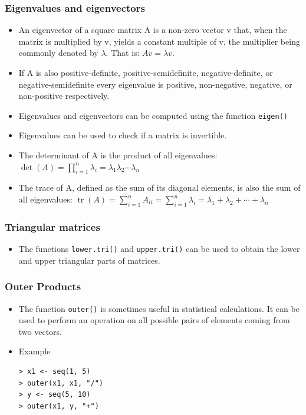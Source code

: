 \documentclass[10pt]{beamer}
\begin{document}
\begin{frame}
  \frametitle{Eigenvalues and eigenvectors}

  \begin{itemize}
  \item An eigenvector of a square matrix A is a non-zero vector v
    that, when the matrix is multiplied by v, yields a constant
    multiple of v, the multiplier being commonly denoted by
    $\lambda$. That is: $A v = \lambda v$.

  \item If A is also positive-definite, positive-semidefinite,
    negative-definite, or negative-semidefinite every eigenvalue is
    positive, non-negative, negative, or non-positive respectively.

  \item Eigenvalues and eigenvectors can be computed using the
    function \texttt{eigen()}

  \item Eigenvalues can be used to check if a matrix is invertible.

  \item The determinant of A is the product of all eigenvalues:
    $\operatorname{det}(A) = \prod_{i=1}^n \lambda_i=\lambda_1\lambda_2\cdots\lambda_n$

  \item
    The trace of A, defined as the sum of its diagonal elements, is also the sum of all eigenvalues:
    $\operatorname{tr}(A) = \sum_{i=1}^n A_{i i} = \sum_{i=1}^n \lambda_i = \lambda_1+ \lambda_2 +\cdots+ \lambda_n$

  \end{itemize}

\end{frame}

\begin{frame}
  \frametitle{Triangular matrices}

  \begin{itemize}
  \item The functions \texttt{lower.tri()} and \texttt{upper.tri()}
    can be used to obtain the lower and upper triangular parts of
    matrices.
  \end{itemize}
\end{frame}

\begin{frame}[fragile]
  \frametitle{Outer Products}

  \begin{itemize}
  \item The function \texttt{outer()} is sometimes useful in
    statistical calculations. It can be used to perform an operation
    on all possible pairs of elements coming from two vectors.

  \item Example

\begin{verbatim}
> x1 <- seq(1, 5)
> outer(x1, x1, "/")
> y <- seq(5, 10)
> outer(x1, y, "+")
\end{verbatim}

  \end{itemize}
\end{frame}
\end{document}
